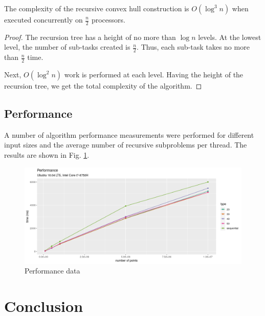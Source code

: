 \documentclass[a4paper,english,numberwithinsect,notab]{eurocg20-submission}
\begin{document}
	\begin{theorem}
		The complexity of the recursive convex hull construction is $O(\log^3n)$ when executed concurrently on $\frac{n}{2}$ processors.
	\end{theorem}
	
	\begin{proof}
		The recursion tree has a height of no more than $\log n$ levels. At the lowest level, the number of sub-tasks created is $\frac{n}{2}$. Thus, each sub-task takes no more than $\frac{n}{2}$ time.
		
		Next, $O(\log^2 n)$ work is performed at each level. Having the height of the recursion tree, we get the total complexity of the algorithm.
	\end{proof}	


\subsection{Performance}



	A number of algorithm performance measurements were performed for different input sizes and the average number of recursive subproblems per thread. The results are shown in Fig. \ref{fig:performance}.
	
	\begin{figure}[h]
		\centering
		\includegraphics[width=1\textwidth, height=0.4\textheight]{performance}
		\caption{Performance data}
		\label{fig:performance}
	\end{figure}


\section{Conclusion}
\label{sec:coclusion}
\end{document}
